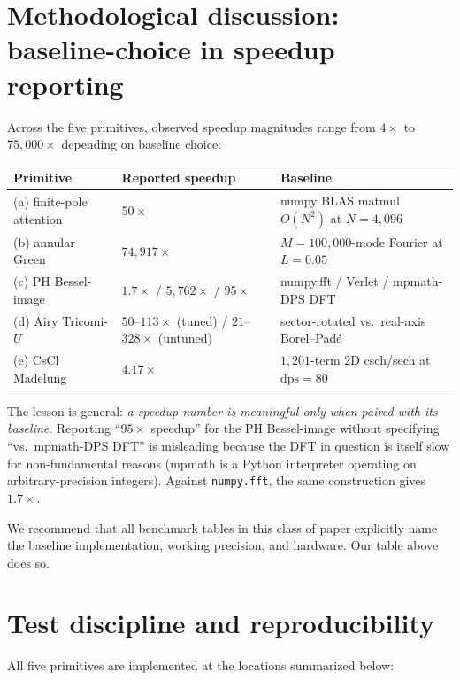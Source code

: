 \documentclass[11pt,reqno]{amsart}
\theoremstyle{definition}
\newcommand{\dps}{\mathrm{dps}}
\begin{document}
\section{Methodological discussion: baseline-choice in speedup reporting}\label{sec:baseline}

Across the five primitives, observed speedup magnitudes range from
$4\times$ to $75{,}000\times$ depending on baseline choice:

\begin{center}
\begin{tabular}{lll}
\toprule
Primitive & Reported speedup & Baseline \\
\midrule
(a) finite-pole attention & $50\times$ & numpy BLAS matmul $O(N^2)$ at $N = 4{,}096$ \\
(b) annular Green & $74{,}917\times$ & $M = 100{,}000$-mode Fourier at $L = 0.05$ \\
(c) PH Bessel-image & $1.7\times$ / $5{,}762\times$ / $95\times$ & numpy.fft / Verlet / mpmath-DPS DFT \\
(d) Airy Tricomi-$U$ & $50$--$113\times$ (tuned) / $21$--$328\times$ (untuned) & sector-rotated vs.\ real-axis Borel--Pad\'e \\
(e) CsCl Madelung & $4.17\times$ & $1{,}201$-term 2D csch/sech at $\dps = 80$ \\
\bottomrule
\end{tabular}
\end{center}

The lesson is general: \emph{a speedup number is meaningful only when
paired with its baseline}. Reporting ``$95\times$ speedup'' for the PH
Bessel-image without specifying ``vs.\ mpmath-DPS DFT'' is misleading
because the DFT in question is itself slow for non-fundamental reasons
(mpmath is a Python interpreter operating on arbitrary-precision
integers). Against \texttt{numpy.fft}, the same construction gives
$1.7\times$.

We recommend that all benchmark tables in this class of paper
explicitly name the baseline implementation, working precision, and
hardware. Our table above does so.

\section{Test discipline and reproducibility}\label{sec:tests}

All five primitives are implemented at the locations summarized below:
\end{document}
